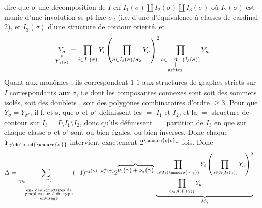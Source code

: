   dire que  $\sigma$   une  décomposition de $I$ en $I_1(\sigma)\amalg I_2(\sigma)\amalg I_3(\sigma)$ où $I_2(\sigma)$ est munie d'une involution ss pt fixe $\sigma_2$ (i.e. d'une   d'équivalence à classes de cardinal $2$),  et $I_3(\sigma)$ d'une structure de
contour orienté, et
\[
\underset{\substack{\shortparallel\\Y_{\gamma(\sigma)}}}{Y_\sigma}
=\prod_{i\in I_1(\sigma)}Y_i
\left(\prod_{a\in I_2(\sigma)/\sigma_2}Y_a\right)^2
\prod_{a\in\underset{\substack{|\\\text{arêtes}}}{A}(I_3(\sigma))}Y_a
\]
Quant aux monômes , ils correspondent $1$-$1$ aux structures de graphes  stricts \inserted{$\gamma$} sur $I$ correspondants aux $\sigma$, i.e dont les composantes connexes sont soit des sommets isolés, soit des  doublets
, soit des polygônes combinatoires d'ordre  $\geq3$. Pour que $Y_\sigma=Y_{\sigma'}$, il f. et s.  que $\sigma$ et $\sigma'$ définissent les $=$ $I_1$ et $I_2$, et  la $=$ structure  de contour sur $I_3=I\setminus I_1\setminus I_2$, donc qu'ils  définissent $=$ partition de $I_3$ en   que sur chaque classe $\sigma$ et $\sigma'$ sont ou bien égales, ou bien inverses. Donc chaque $Y_{\gamma\deleted{\unsure{\sigma}}}$ intervient exactement $2^{\unsure{\nu|v}_*}$ fois. Donc
\[
\begin{aligned}
\Delta={}&\sum_{\gamma\in\underset{\substack{\downarrow\\\text{ens des structures de}\\\text{graphes sur }I\text{ du type}\\\text{envisagé}}}{\Gamma_I}}
(-1)^{\nu_2(\gamma)+\nu_*^+(\gamma)}
2^{\overbrace{\nu_1(\gamma)+\nu_*(\gamma)}}\,
\underbrace{\begin{aligned}
&\prod_{i\in I_1(\unsure{\sigma|\gamma})}Y_i
\left(\prod_{a\in A(I_2(\gamma))}Y_a\right)^2\\
&\qquad\prod_{a\in A(I_3(\gamma))}Y_a
\end{aligned}}_{M_\gamma}
\end{aligned}
\]

